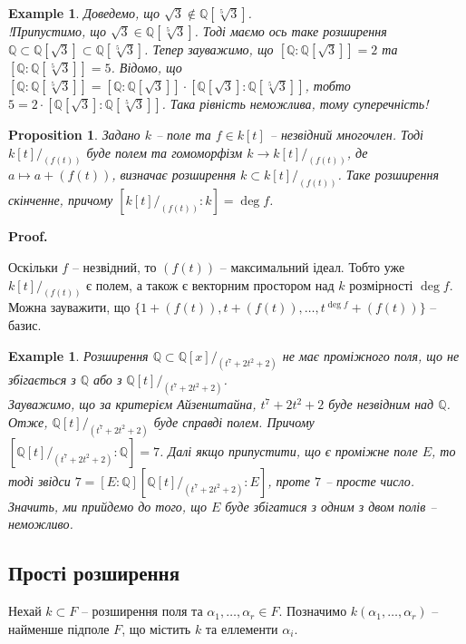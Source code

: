 \documentclass[a4paper, 10pt]{article}
\makeatletter
\theoremstyle{theoremdd}
\theoremstyle{theoremdd}
\theoremstyle{theoremdd}
\theoremstyle{theoremdd}
\theoremstyle{theoremdd}
\newtheorem{example}[theorem]{Example}
\theoremstyle{theoremdd}
\theoremstyle{theoremdd}
\theoremstyle{theoremdd}
\theoremstyle{theoremdd}
\newtheorem{proposition}[theorem]{Proposition}
\theoremstyle{theoremdd}
\theoremstyle{theoremdd}
\theoremstyle{theoremdd}
\theoremstyle{theoremdd}
\theoremstyle{theoremdd}
\theoremstyle{theoremdd}
\renewenvironment{proof}[1][Proof.\\]{\par
\pushQED{\hfill \qed}%
\normalfont \topsep6\p@\@plus6\p@\relax
\trivlist
\item\relax
{\bfseries
#1\@addpunct{.}}\hspace\labelsep\ignorespaces
}{%
\popQED\endtrivlist\@endpefalse
}
\makeatother
\begin{document}
\begin{example}
Доведемо, що $\sqrt{3} \notin \mathbb{Q}[\sqrt[5]{3}]$.\\
!Припустимо, що $\sqrt{3} \in \mathbb{Q}[\sqrt[5]{3}]$. Тоді маємо ось таке розширення $\mathbb{Q} \subset \mathbb{Q}[\sqrt{3}] \subset \mathbb{Q}[\sqrt[5]{3}]$. Тепер зауважимо, що $[\mathbb{Q}: \mathbb{Q}[\sqrt{3}]] = 2$ та $[\mathbb{Q} : \mathbb{Q}[\sqrt[5]{3}]] = 5$. Відомо, що $[\mathbb{Q}: \mathbb{Q}[\sqrt[5]{3}]] = [\mathbb{Q} : \mathbb{Q}[\sqrt{3}]] \cdot [\mathbb{Q}[\sqrt{3}] : \mathbb{Q}[\sqrt[5]{3}]]$,  тобто $5 = 2 \cdot [\mathbb{Q}[\sqrt{3}] : \mathbb{Q}[\sqrt[5]{3}]]$. Така рівність неможлива, тому суперечність!
\end{example}

\begin{proposition}
Задано $k$ -- поле та $f \in k[t]$ -- незвідний многочлен. Тоді $k[t]/_{(f(t))}$ буде полем та гомоморфізм $k \to k[t]/_{(f(t))}$, де $a \mapsto a + (f(t))$, визначає розширення $k \subset k[t]/_{(f(t))}$. Таке розширення скінченне, причому $\left[ k[t]/_{(f(t))} : k \right] = \deg f$.
\end{proposition}

\begin{proof}
Оскільки $f$ -- незвідний, то $(f(t))$ -- максимальний ідеал. Тобто уже $k[t]/_{(f(t))}$ є полем, а також є векторним простором над $k$ розмірності $\deg f$.\\
Можна зауважити, що $\{1 + (f(t)), t + (f(t)), \dots, t^{\deg f} + (f(t))\}$ -- базис.
\end{proof}

\begin{example}
Розширення $\mathbb{Q} \subset \mathbb{Q}[x]/_{(t^7+2t^2+2)}$ не має проміжного поля, що не збігається з $\mathbb{Q}$ або з $\mathbb{Q}[t]/_{(t^7+2t^2+2)}$.\\
Зауважимо, що за критерієм Айзенштайна, $t^7 + 2t^2 +2$ буде незвідним над $\mathbb{Q}$. Отже, $\mathbb{Q}[t]/_{(t^7+2t^2+2)}$ буде справді полем. Причому $\left[\mathbb{Q}[t]/_{(t^7+2t^2+2)} : \mathbb{Q} \right] = 7$. Далі якщо припустити, що є проміжне поле $E$, то тоді звідси $7 = [E: \mathbb{Q}] \left[ \mathbb{Q}[t]/_{(t^7 + 2t^2+2)} : E \right]$, проте $7$ -- просте число. Значить, ми прийдемо до того, що $E$ буде збігатися з одним з двом полів -- неможливо.
\end{example}

\subsection{Прості розширення}
Нехай $k \subset F$ -- розширення поля та $\alpha_1,\dots,\alpha_r \in F$. Позначимо $k(\alpha_1,\dots,\alpha_r)$ -- найменше підполе $F$, що містить $k$ та еллементи $\alpha_i$.
\end{document}
